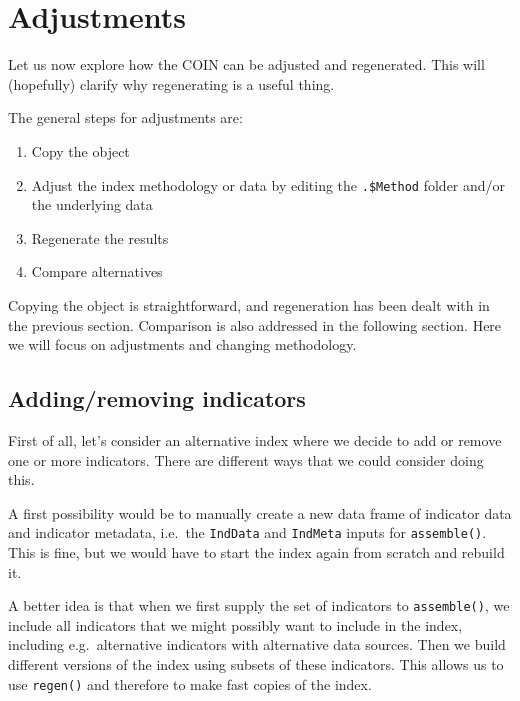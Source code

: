 \documentclass[
]{book}
\providecommand{\tightlist}{%
  \setlength{\itemsep}{0pt}\setlength{\parskip}{0pt}}
\begin{document}
\hypertarget{adjustments}{%
\section{Adjustments}\label{adjustments}}

Let us now explore how the COIN can be adjusted and regenerated. This will (hopefully) clarify why regenerating is a useful thing.

The general steps for adjustments are:

\begin{enumerate}
\def\labelenumi{\arabic{enumi}.}
\tightlist
\item
  Copy the object
\item
  Adjust the index methodology or data by editing the \texttt{.\$Method} folder and/or the underlying data
\item
  Regenerate the results
\item
  Compare alternatives
\end{enumerate}

Copying the object is straightforward, and regeneration has been dealt with in the previous section. Comparison is also addressed in the following section. Here we will focus on adjustments and changing methodology.

\hypertarget{addingremoving-indicators}{%
\subsection{Adding/removing indicators}\label{addingremoving-indicators}}

First of all, let's consider an alternative index where we decide to add or remove one or more indicators. There are different ways that we could consider doing this.

A first possibility would be to manually create a new data frame of indicator data and indicator metadata, i.e.~the \texttt{IndData} and \texttt{IndMeta} inputs for \texttt{assemble()}. This is fine, but we would have to start the index again from scratch and rebuild it.

A better idea is that when we first supply the set of indicators to \texttt{assemble()}, we include all indicators that we might possibly want to include in the index, including e.g.~alternative indicators with alternative data sources. Then we build different versions of the index using subsets of these indicators. This allows us to use \texttt{regen()} and therefore to make fast copies of the index.
\end{document}
